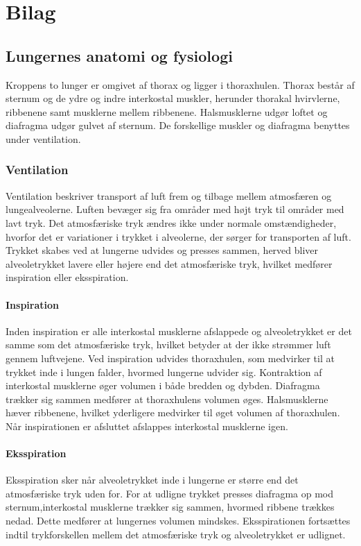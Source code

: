 \chapter{Bilag}
\section{Lungernes anatomi og fysiologi} \label{BilagA}
Kroppens to lunger er omgivet af thorax og ligger i thoraxhulen. Thorax består af sternum og de ydre og indre interkostal muskler, herunder thorakal hvirvlerne, ribbenene samt musklerne mellem ribbenene. Halsmusklerne udgør loftet og diafragma udgør gulvet af sternum. De forskellige muskler og diafragma benyttes under ventilation. \citep{Martini2012, Sand2008}

\subsection{Ventilation}
Ventilation beskriver transport af luft frem og tilbage mellem atmosfæren og lungealveolerne. Luften bevæger sig fra områder med højt tryk til områder med lavt tryk. Det atmosfæriske tryk ændres ikke under normale omstændigheder, hvorfor det er variationer i trykket i alveolerne, der sørger for transporten af luft. Trykket skabes ved at lungerne udvides og presses sammen, herved bliver alveoletrykket lavere eller højere end det atmosfæriske tryk, hvilket medfører inspiration eller eksspiration. \citep{Martini2012, Sand2008}

\subsubsection{Inspiration}
Inden inspiration er alle interkostal musklerne afslappede og alveoletrykket er det samme som det atmosfæriske tryk, hvilket betyder at der ikke strømmer luft gennem luftvejene. Ved inspiration udvides thoraxhulen, som medvirker til at trykket inde i lungen falder, hvormed  lungerne udvider sig. Kontraktion af interkostal musklerne øger volumen i både bredden og dybden. Diafragma trækker sig sammen medfører at thoraxhulens volumen øges. Halsmusklerne hæver ribbenene, hvilket yderligere medvirker til øget volumen af thoraxhulen. Når inspirationen er afsluttet afslappes interkostal musklerne igen.\citep{Martini2012, Sand2008}

\subsubsection{Eksspiration}
Eksspiration sker når alveoletrykket inde i lungerne er større end det atmosfæriske tryk uden for. For at udligne trykket presses diafragma op mod sternum,interkostal musklerne trækker sig sammen, hvormed ribbene trækkes nedad. Dette medfører at lungernes volumen mindskes. Eksspirationen fortsættes indtil trykforskellen mellem det atmosfæriske tryk og alveoletrykket er udlignet. \citep{Martini2012, Sand2008}

